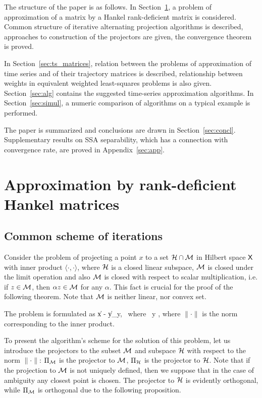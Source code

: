 \documentclass[sii]{ipart}
\begin{document}
The structure of the paper is as follows.  In Section~\ref{sec:lowrank_appr}, a problem of approximation of a matrix by a Hankel rank-deficient matrix is considered. Common structure of iterative alternating projection algorithms is described, approaches to construction of the projectors are given, the convergence theorem is proved.

In Section~\ref{sec:ts_matrices}, relation between the problems of approximation of time series and of their trajectory matrices is described, relationship between weights in equivalent weighted least-squares problems is also given. Section~\ref{sec:alg} contains the suggested time-series approximation algorithms. In Section~\ref{sec:simul}, a numeric comparison of algorithms on a typical example is performed.

The paper is summarized and conclusions are drawn in Section~\ref{sec:concl}. Supplementary results on SSA separability, which has a connection with convergence rate, are proved in Appendix~\ref{sec:app}.

\section{Approximation by rank-deficient Hankel matrices}
\label{sec:lowrank_appr}
\subsection{Common scheme of iterations}
Consider the problem of projecting a point $x$ to a set $\mathcal{H} \cap \mathcal{M}$ in Hilbert space $\mathsf{X}$ with inner product $\langle \cdot, \cdot \rangle$, where $\mathcal{H}$ is a closed linear subspace, $\mathcal{M}$ is closed under the limit operation and also $\mathcal{M}$ is closed with respect to scalar multiplication, i.e.
if $z \in \mathcal{M}$, then $\alpha z\in \mathcal{M}$ for any $\alpha$. This fact is crucial for the proof of the following theorem. Note that  $\mathcal{M}$ is neither  linear, nor convex set.

The problem is formulated as
\be
\label{eq:gen_task}
\|x - y\| \to \min_y, \mbox{\ where\ } y \in \calH \cap \calM,
\ee
where $\|\cdot\|$ is the norm corresponding to the inner product.

To present the algorithm's scheme for the solution of this problem, let us introduce the projectors to the subset $\mathcal{M}$ and subspace $\mathcal{H}$ with respect to the norm $\|\cdot\|$: $\Pi_{\mathcal{M}}$ is the projector to $\mathcal{M}$,
$\Pi_{\mathcal{H}}$ is the projector to $\mathcal{H}$.
Note that if the projection to $\mathcal{M}$ is not uniquely defined, then we suppose that in the case of ambiguity any closest point is chosen. 
The projector to $\mathcal{H}$ is evidently orthogonal, while $\Pi_{\mathcal{M}}$ is orthogonal due to the following proposition.
\end{document}
